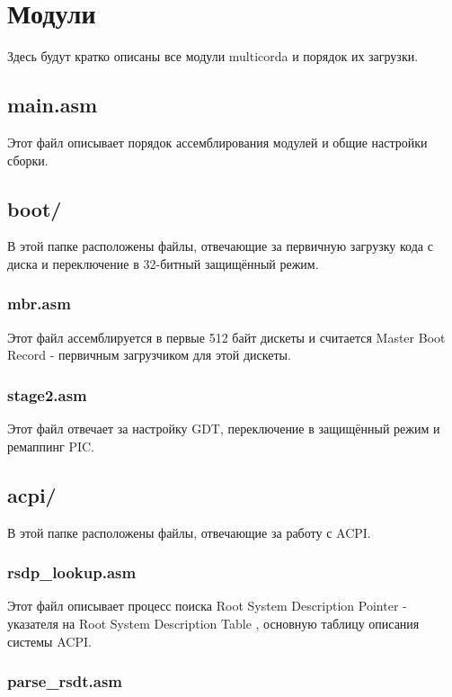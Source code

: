 \chapter{Модули}

Здесь будут кратко описаны все модули multicorda и порядок их загрузки.

\section{main.asm}

Этот файл описывает порядок ассемблирования модулей и общие настройки сборки.

\section{boot/}

В этой папке расположены файлы, отвечающие за первичную загрузку кода с диска и переключение в 32-битный защищённый режим.

\subsection{mbr.asm}

Этот файл ассемблируется в первые 512 байт дискеты и считается Master Boot Record - первичным загрузчиком для этой дискеты.

\subsection{stage2.asm}

Этот файл отвечает за настройку GDT, переключение в защищённый режим и ремаппинг PIC.

\section{acpi/}

В этой папке расположены файлы, отвечающие за работу с ACPI.

\subsection{rsdp\_lookup.asm}

Этот файл описывает процесс поиска Root System Description Pointer \cite{rsdp} - указателя на Root System Description Table \cite{rsdt}, основную таблицу описания системы ACPI.

\subsection{parse\_rsdt.asm}

